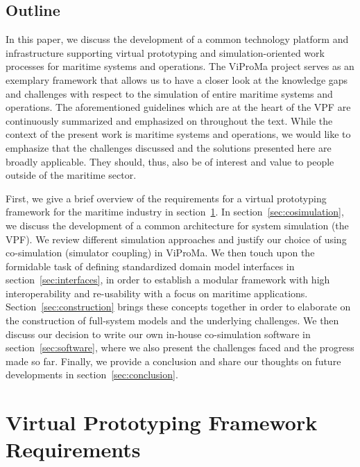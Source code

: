 \documentclass[prb,aps,showpacs,floatfix,twocolumn,10pt]{revtex4-1}
\theoremstyle{plain}
\theoremstyle{remark}
\begin{document}
\subsection{Outline}
\label{subsec:introduction:outline}

In this paper, we discuss the development of a common technology platform and infrastructure supporting virtual prototyping and simulation-oriented work processes for maritime systems and operations.
The ViProMa project serves as an exemplary framework that allows us to have a closer look at the knowledge gaps and challenges with respect to the simulation of entire maritime systems and operations.
The aforementioned guidelines which are at the heart of the VPF are continuously summarized and emphasized on throughout the text.
While the context of the present work is maritime systems and operations, we would like to emphasize that the challenges discussed and the solutions presented here are broadly applicable.
They should, thus, also be of interest and value to people outside of the maritime sector.

First, we give a brief overview of the requirements for a virtual prototyping framework for the maritime industry in section~\ref{sec:requirements}.
In section~\ref{sec:cosimulation}, we discuss the development of a common architecture for system simulation (the VPF).
We review different simulation approaches and justify our choice of using co-simulation (simulator coupling) in ViProMa.
We then touch upon the formidable task of defining standardized domain model interfaces in section~\ref{sec:interfaces}, in order to establish a modular framework with high interoperability and re-usability with a focus on maritime applications.
Section~\ref{sec:construction} brings these concepts together in order to elaborate on the construction of full-system models and the underlying challenges.
We then discuss our decision to write our own in-house co-simulation software in section~\ref{sec:software}, where we also present the challenges faced and the progress made so far.
Finally, we provide a conclusion and share our thoughts on future developments in section~\ref{sec:conclusion}.





\section{Virtual Prototyping Framework Requirements}
\label{sec:requirements}
\end{document}

